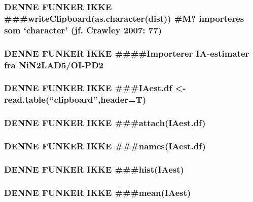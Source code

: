 \documentclass[]{article}
\begin{document}
\hypertarget{denne-funker-ikke-writeclipboardas.characterdist-m-importeres-som-character-jf.-crawley-2007-77}{%
\subsubsection{DENNE FUNKER IKKE
\#\#\#writeClipboard(as.character(dist)) \#M? importeres som `character'
(jf. Crawley 2007:
77)}\label{denne-funker-ikke-writeclipboardas.characterdist-m-importeres-som-character-jf.-crawley-2007-77}}

\hypertarget{denne-funker-ikke-importerer-ia-estimater-fra-nin2lad5oi-pd2}{%
\subsubsection{DENNE FUNKER IKKE \#\#\#\#Importerer IA-estimater fra
NiN2LAD5/OI-PD2}\label{denne-funker-ikke-importerer-ia-estimater-fra-nin2lad5oi-pd2}}

\hypertarget{denne-funker-ikke-iaest.df---read.tableclipboardheadert}{%
\subsubsection{DENNE FUNKER IKKE \#\#\#IAest.df \textless{}-
read.table(``clipboard'',header=T)}\label{denne-funker-ikke-iaest.df---read.tableclipboardheadert}}

\hypertarget{denne-funker-ikke-attachiaest.df}{%
\subsubsection{DENNE FUNKER IKKE
\#\#\#attach(IAest.df)}\label{denne-funker-ikke-attachiaest.df}}

\hypertarget{denne-funker-ikke-namesiaest.df}{%
\subsubsection{DENNE FUNKER IKKE
\#\#\#names(IAest.df)}\label{denne-funker-ikke-namesiaest.df}}

\hypertarget{denne-funker-ikke-histiaest}{%
\subsubsection{DENNE FUNKER IKKE
\#\#\#hist(IAest)}\label{denne-funker-ikke-histiaest}}

\hypertarget{denne-funker-ikke-meaniaest}{%
\subsubsection{DENNE FUNKER IKKE
\#\#\#mean(IAest)}\label{denne-funker-ikke-meaniaest}}
\end{document}
